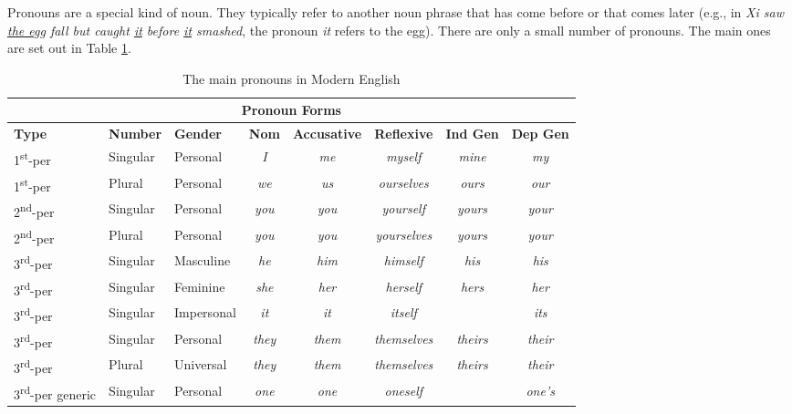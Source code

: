Pronouns are a special kind of noun. They typically refer to another noun phrase that has come before or that comes later (e.g., in \textit{Xi saw \uline{the egg} fall but caught \uline{it} before \uline{it} smashed}, the pronoun \textit{it} refers to the egg). There are only a small number of pronouns. The main ones are set out in Table \ref{tab:pronouns}.

\begin{table}
\centering
\caption{The main pronouns in Modern English}
\label{tab:pronouns}
\begin{tabular}{l l l c c c c c}
\multicolumn{8}{c}{\textbf{Pronoun Forms}} \\
\hline
\textbf{Type} & \textbf{Number} & \textbf{Gender} & \textbf{Nom} & \textbf{Accusative} & \textbf{Reflexive} & \textbf{Ind Gen} & \textbf{Dep Gen} \\
\hline
1\textsuperscript{st}-per & Singular & Personal & \textit{I} & \textit{me} & \textit{myself} & \textit{mine} & \textit{my} \\
1\textsuperscript{st}-per & Plural & Personal & \textit{we} & \textit{us} & \textit{ourselves} & \textit{ours} & \textit{our} \\
2\textsuperscript{nd}-per & Singular & Personal & \textit{you} & \textit{you} & \textit{yourself} & \textit{yours} & \textit{your} \\
2\textsuperscript{nd}-per & Plural & Personal & \textit{you} & \textit{you} & \textit{yourselves} & \textit{yours} & \textit{your} \\
3\textsuperscript{rd}-per & Singular & Masculine & \textit{he} & \textit{him} & \textit{himself} & \textit{his} & \textit{his} \\
3\textsuperscript{rd}-per & Singular & Feminine & \textit{she} & \textit{her} & \textit{herself} & \textit{hers} & \textit{her} \\
3\textsuperscript{rd}-per & Singular & Impersonal & \textit{it} & \textit{it} & \textit{itself} & & \textit{its} \\
3\textsuperscript{rd}-per & Singular & Personal & \textit{they} & \textit{them} & \textit{themselves} & \textit{theirs} & \textit{their} \\
3\textsuperscript{rd}-per & Plural & Universal & \textit{they} & \textit{them} & \textit{themselves} & \textit{theirs} & \textit{their} \\
3\textsuperscript{rd}-per generic & Singular & Personal & \textit{one} & \textit{one} & \textit{oneself} & & \textit{one's} \\

\end{tabular}
\end{table}
